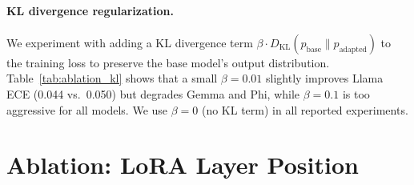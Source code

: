 \paragraph{KL divergence regularization.}
We experiment with adding a KL divergence term
$\beta \cdot D_{\text{KL}}(p_{\text{base}} \| p_{\text{adapted}})$
to the training loss to preserve the base model's output distribution.
Table~\ref{tab:ablation_kl} shows that a small $\beta{=}0.01$ slightly
improves Llama ECE (0.044 vs.\ 0.050) but degrades Gemma and Phi,
while $\beta{=}0.1$ is too aggressive for all models.
We use $\beta{=}0$ (no KL term) in all reported experiments.

\begin{table}[htbp]
\centering
\small
{}%
\caption{KL regularization ablation across models (SECL + entropy gating).}
\label{tab:ablation_kl}
\end{table}

\section{Ablation: LoRA Layer Position} \label{app:layer_ablation}

